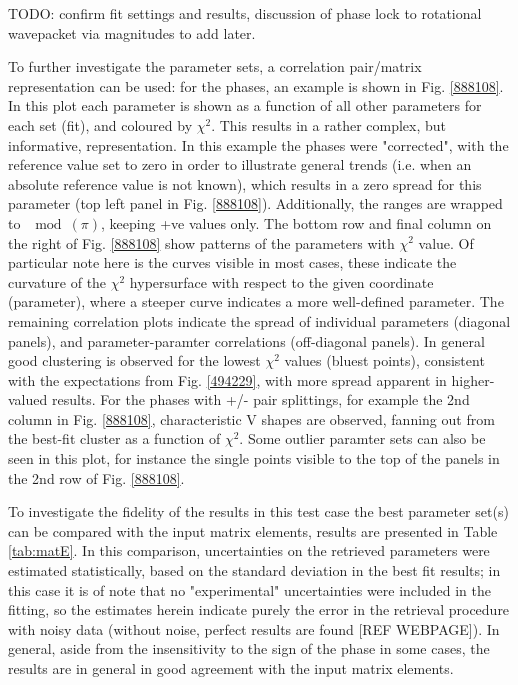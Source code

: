 TODO: confirm fit settings and results, discussion of phase lock to rotational wavepacket via magnitudes to add later.

To further investigate the parameter sets, a correlation pair/matrix representation can be used: for the phases, an example is shown in Fig. \ref{888108}. In this plot each parameter is shown as a function of all other parameters for each set (fit), and coloured by $\chi^2$. This results in a rather complex, but informative, representation. In this example the phases were "corrected", with the reference value set to zero in order to illustrate general trends (i.e. when an absolute reference value is not known), which results in a zero spread for this parameter (top left panel in Fig. \ref{888108}). Additionally, the ranges are wrapped to $\mod(\pi)$, keeping +ve values only. The bottom row and final column on the right of Fig. \ref{888108} show patterns of the parameters with $\chi^2$ value. Of particular note here is the curves visible in most cases, these indicate the curvature of the $\chi^2$ hypersurface with respect to the given coordinate (parameter), where a steeper curve indicates a more well-defined parameter. The remaining correlation plots indicate the spread of individual parameters (diagonal panels), and parameter-paramter correlations (off-diagonal panels). In general good clustering is observed for the lowest $\chi^2$ values (bluest points), consistent with the expectations from Fig. \ref{494229}, with more spread apparent in higher-valued results. For the phases with +/- pair splittings, for example the 2nd column in Fig. \ref{888108}, characteristic V shapes are observed, fanning out from the best-fit cluster as a function of $\chi^2$. Some outlier paramter sets can also be seen in this plot, for instance the single points visible to the top of the panels in the 2nd row of Fig. \ref{888108}.

To investigate the fidelity of the results in this test case the best parameter set(s) can be compared with the input matrix elements, results are presented in Table \ref{tab:matE}. In this comparison, uncertainties on the retrieved parameters were estimated statistically, based on the standard deviation in the best fit results; in this case it is of note that no "experimental" uncertainties were included in the fitting, so the estimates herein indicate purely the error in the retrieval procedure with noisy data (without noise, perfect results are found [REF WEBPAGE]). In general, aside from the insensitivity to the sign of the phase in some cases, the results are in general in good agreement with the input matrix elements.

